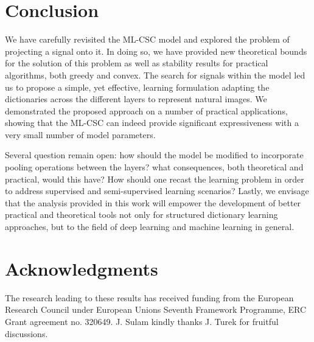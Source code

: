 \documentclass[10pt,journal]{IEEEtran}
\theoremstyle{plain}
\theoremstyle{definition}
\begin{document}
\section{Conclusion}
\label{sec:conclusions}

We have carefully revisited the ML-CSC model and explored the problem of projecting a signal onto it. In doing so, we have provided new theoretical bounds for the solution of this problem as well as stability results for practical algorithms, both greedy and convex. The search for signals within the model led us to propose a simple, yet effective, learning formulation adapting the dictionaries across the different layers to represent natural images. %
We demonstrated the proposed approach on a number of practical applications, showing that the ML-CSC can indeed provide significant expressiveness with a very small number of model parameters. 

Several question remain open: how should the model be modified to incorporate pooling operations between the layers? what consequences, both theoretical and practical, would this have? How should one recast the learning problem in order to address supervised and semi-supervised learning scenarios? Lastly, we envisage that the analysis provided in this work will empower the development of better practical and theoretical tools not only for structured dictionary learning approaches, but to the field of deep learning and machine learning in general.

\section{Acknowledgments}
The research leading to these results has received funding from the European Research Council under European Unions Seventh Framework Programme, ERC Grant agreement no. 320649. J. Sulam kindly thanks J. Turek for fruitful discussions.







\end{document}
